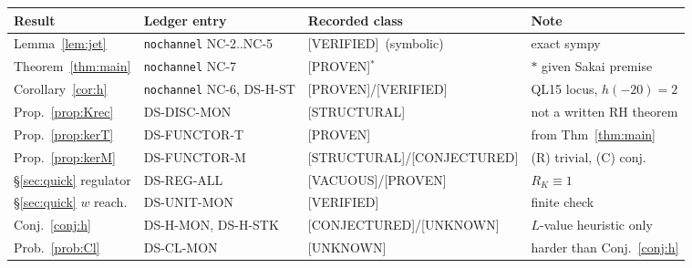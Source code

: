 \documentclass[11pt]{article}
\theoremstyle{definition}
\newcommand{\PROVEN}{\textsf{[PROVEN]}}
\newcommand{\VERIFIED}{\textsf{[VERIFIED]}}
\newcommand{\STRUCTURAL}{\textsf{[STRUCTURAL]}}
\newcommand{\CONJ}{\textsf{[CONJECTURED]}}
\newcommand{\UNK}{\textsf{[UNKNOWN]}}
\newcommand{\VAC}{\textsf{[VACUOUS]}}
\begin{document}
\begin{center}\small
\begin{tabular}{l l l l}
\hline
Result & Ledger entry & Recorded class & Note\\
\hline
Lemma~\ref{lem:jet}        & \texttt{nochannel} NC-2..NC-5 & \VERIFIED\ (symbolic) & exact sympy\\
Theorem~\ref{thm:main}     & \texttt{nochannel} NC-7       & \PROVEN$^\ast$        & $\ast$ given Sakai premise\\
Corollary~\ref{cor:h}      & \texttt{nochannel} NC-6, DS-H-ST & \PROVEN/\VERIFIED  & QL15 locus, $h(-20)=2$\\
Prop.~\ref{prop:Krec}      & DS-DISC-MON                   & \STRUCTURAL           & not a written RH theorem\\
Prop.~\ref{prop:kerT}      & DS-FUNCTOR-T                  & \PROVEN               & from Thm~\ref{thm:main}\\
Prop.~\ref{prop:kerM}      & DS-FUNCTOR-M                  & \STRUCTURAL/\CONJ     & (R) trivial, (C) conj.\\
\S\ref{sec:quick} regulator& DS-REG-ALL                    & \VAC/\PROVEN          & $R_K\equiv1$\\
\S\ref{sec:quick} $w$ reach.& DS-UNIT-MON                  & \VERIFIED             & finite check\\
Conj.~\ref{conj:h}         & DS-H-MON, DS-H-STK            & \CONJ/\UNK            & $L$-value heuristic only\\
Prob.~\ref{prob:Cl}        & DS-CL-MON                     & \UNK                  & harder than Conj.~\ref{conj:h}\\
\hline
\end{tabular}
\end{center}
\end{document}
